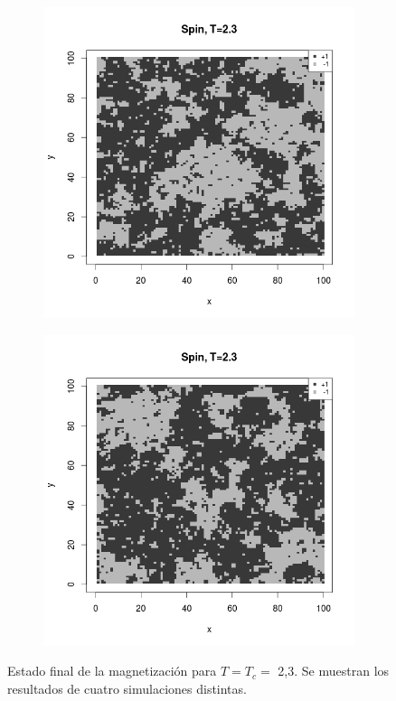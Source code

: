 \documentclass{scrartcl}
\begin{document}
\begin{figure}[ht]
\begin{subfigure}{.5\textwidth}
\end{subfigure}
\begin{subfigure}{.5\textwidth}
  \centering
  \includegraphics[width=1\linewidth]{spins/spinT2_3_3}
\end{subfigure}%
\begin{subfigure}{.5\textwidth}
  \centering
  \includegraphics[width=1\linewidth]{spins/spinT2_3_4}
\end{subfigure}
\caption{Estado final de la magnetización para $T=T_c=$ 2,3. Se muestran los resultados de cuatro simulaciones distintas.}
\label{fig:spinsTc}
\end{figure}
\end{document}
